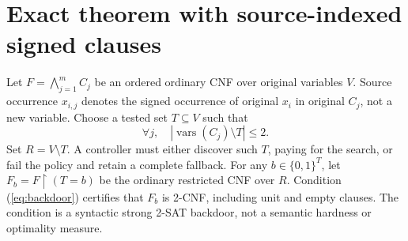 \documentclass[11pt]{article}
\begin{document}
\section{Exact theorem with source-indexed signed clauses}
Let $F=\bigwedge_{j=1}^{m}C_j$ be an ordered ordinary CNF over original variables $V$. Source occurrence $x_{i,j}$ denotes the signed occurrence of original $x_i$ in original $C_j$, not a new variable. Choose a tested set $T\subseteq V$ such that
\begin{equation}\label{eq:backdoor}
\forall j,\quad |\operatorname{vars}(C_j)\setminus T|\le 2.
\end{equation}
Set $R=V\setminus T$. A controller must either discover such $T$, paying for the search, or fail the policy and retain a complete fallback. For any $b\in\{0,1\}^{T}$, let $F_b=F\upharpoonright (T=b)$ be the ordinary restricted CNF over $R$. Condition (\ref{eq:backdoor}) certifies that $F_b$ is 2-CNF, including unit and empty clauses. The condition is a syntactic strong 2-SAT backdoor, not a semantic hardness or optimality measure.
\end{document}

